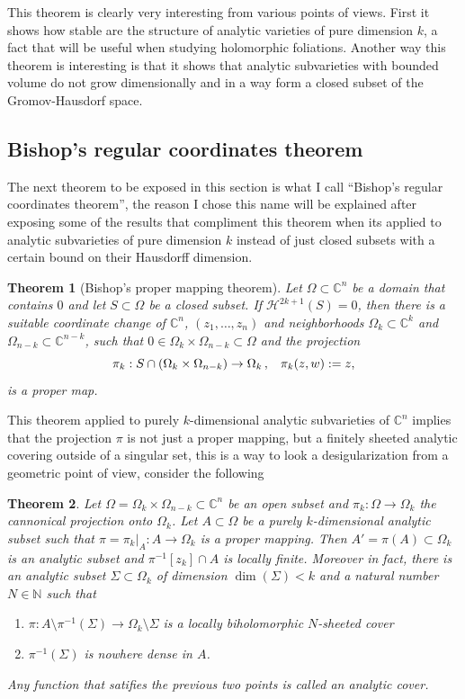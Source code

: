 \documentclass[12pt,twoside,a4paper]{report}
\newtheorem{theorem}{Theorem}[section]
\newcommand{\nat}{\ensuremath{ \mathbb N }}
\newcommand{\co}{\ensuremath{\mathbb C }}
\newcommand{\con}{\ensuremath{\mathbb{C}^n}}
\newcommand{\om}{\ensuremath{\Omega}}
\newcommand{\sig}{\ensuremath{\Sigma}}
\begin{document}
  This theorem is clearly very interesting from various points of views. First it shows how stable are the structure of analytic varieties of pure dimension $k$, a fact that will be useful when studying holomorphic foliations. Another way this theorem is interesting is that it shows that analytic subvarieties with bounded volume do not grow dimensionally and in a way form a closed subset of the Gromov-Hausdorf space.


  \subsection{Bishop's regular coordinates theorem}
  \noindent The next theorem to be exposed in this section is what I call ``Bishop's regular coordinates theorem'', the reason I chose this name will be explained after exposing some of the results that compliment this theorem when its applied to analytic subvarieties of pure dimension $k$ instead of just closed subsets with a certain bound on their Hausdorff dimension.
  \begin{theorem}[Bishop's proper mapping theorem]\label{bishop mapping}
    Let $\om\subset\con$ be a domain that contains $0$ and let $S\subset\om$ be a closed subset. If $\mathcal{H}^{2k+1}(S)=0$, then there is a suitable coordinate change of $\con$, $(z_1,\ldots,z_n)$ and neighborhoods $\om_k\subset\co^k$ and $\om_{n-k}\subset\co^{n-k}$, such that $0\in\om_k\times\om_{n-k}\subset\om$ and the projection
          \[
            \pi_k:S\cap(\om_k\times\om_{n-k})\rightarrow\om_k\, ,\hspace{0.3cm}\pi_k(z,w):=z,
          \]
          \noindent is a proper map.
  \end{theorem}\label{analytic-cover}
  \noindent This theorem applied to purely $k$-dimensional analytic subvarieties of $\con$ implies that the projection $\pi$ is not just a proper mapping, but a finitely sheeted analytic covering outside of a singular set, this is a way to look a desigularization from a geometric point of view, consider the following
  \begin{theorem}
    Let $\om=\om_{k}\times\om_{n-k}\subset\con$ be an open subset and $\pi_{k}:\om\rightarrow\om_{k}$ the cannonical projection onto $\om_{k}$. Let $A\subset\om$ be a purely $k$-dimensional analytic subset such that $\pi=\pi_{k}\vert_{A}:A\rightarrow\om_{k}$ is a proper mapping. Then $A'=\pi(A)\subset\om_{k}$ is an analytic subset and $\pi^{-1}[z_{k}]\cap A$ is locally finite. Moreover in fact, there is an analytic subset $\sig\subset\om_{k}$ of dimension $\dim(\sig)<k$ and a natural number $N\in\nat$ such that
    \begin{enumerate}
      \item $\pi:A\setminus\pi^{-1}(\sig)\to\om_{k}\setminus\sig$ is a locally biholomorphic $N$-sheeted cover
      \item $\pi^{-1}(\sig)$ is nowhere dense in $A$.
    \end{enumerate}
    Any function that satifies the previous two points is called an \emph{analytic cover}.
  \end{theorem}
\end{document}
